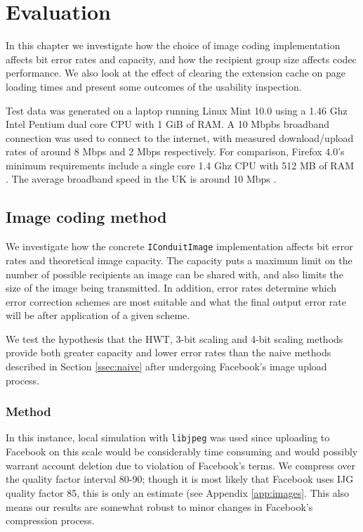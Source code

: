 \chapter{Evaluation}\label{ch:evaluation}
\label{eval}

In this chapter we investigate how the choice of image coding implementation affects bit error rates and capacity, and how the recipient group size affects codec performance. We also look at the effect of clearing the extension cache on page loading times and present some outcomes of the usability inspection.

Test data was generated on a laptop running Linux Mint 10.0 using a 1.46 Ghz Intel Pentium dual core CPU with 1 GiB of RAM. A 10 Mbpbs broadband connection was used to connect to the internet, with measured download/upload rates of around 8 Mbps and 2 Mbps respectively. For comparison, Firefox 4.0's minimum requirements include a single core 1.4 Ghz CPU with 512 MB of RAM \cite{firefox-req}. The average broadband speed in the UK is around 10 Mbps \cite{bband-stats}. 

\section{Image coding method}
\label{sec:imgcod}

We investigate how the concrete {\tt IConduitImage} implementation affects bit error rates and theoretical image capacity. The capacity puts a maximum limit on the number of possible recipients an image can be shared with, and also limits the size of the image being transmitted. In addition, error rates determine which error correction schemes are most suitable and what the final output error rate will be after application of a given scheme.

We test the hypothesis that the HWT, 3-bit scaling and 4-bit scaling methods provide both greater capacity and lower error rates than the naive methods described in Section \ref{ssec:naive} after undergoing Facebook's image upload process.

\subsection{Method}

In this instance, local simulation with {\tt libjpeg} was used since uploading to Facebook on this scale would be considerably time consuming and would possibly warrant account deletion due to violation of Facebook's terms. We compress over the quality factor interval 80-90; though it is most likely that Facebook uses IJG quality factor 85, this is only an estimate (see Appendix \ref{app:images}. This also means our results are somewhat robust to minor changes in Facebook's compression process.

